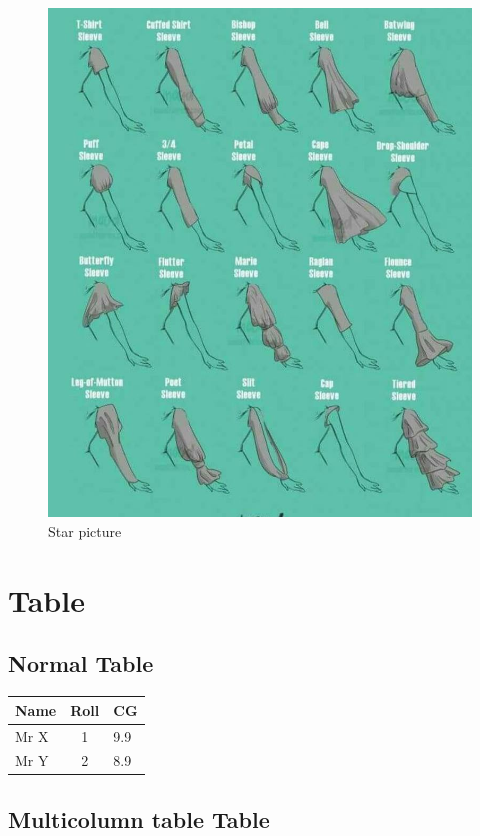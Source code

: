 \documentclass[letter, 12pt]{article}
\begin{document}
\begin{figure}[h]
	\centering
	\includegraphics[scale=0.2]{star.jpg}
	\caption{Star picture}
	\label{pic:star}
\end{figure}

\section{Table}

\subsection{Normal Table}

\begin{tabular}{|l|cl|}
	\hline
	Name & Roll & CG   \\
	\hline
	Mr X & 1   &  9.9 \\ 
	\cline{2-3}
	Mr Y & 2   &  8.9 \\ 
	\cline{1-3}
\end{tabular}


\subsection{Multicolumn table Table}
\end{document}
